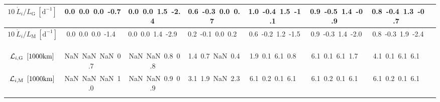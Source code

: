 \begin{table}[H]
{\begin{centering}
\begin{tabular}{|c|c|c|c|c|c|c|c|}
\hline
$10\ \dot{L}_{i}/L_{\mathrm{G}}\ \left[\mathrm{d^{-1}}\right]$ & \textcolor{C1}{0.0}\ \textcolor{C2}{0.0}\ \textcolor{C3}{0.0}\ \textcolor{C4}{-0.7}\  & \textcolor{C1}{0.0}\ \textcolor{C2}{0.0}\ \textcolor{C3}{1.5}\ \textcolor{C4}{-2.4}\  & \textcolor{C1}{0.6}\ \textcolor{C2}{-0.3}\ \textcolor{C3}{0.0}\ \textcolor{C4}{0.7}\  & \textcolor{C1}{1.0}\ \textcolor{C2}{-0.4}\ \textcolor{C3}{1.5}\ \textcolor{C4}{-1.1}\  & \textcolor{C1}{0.9}\ \textcolor{C2}{-0.5}\ \textcolor{C3}{1.4}\ \textcolor{C4}{-0.9}\  & \textcolor{C1}{0.8}\ \textcolor{C2}{-0.4}\ \textcolor{C3}{1.3}\ \textcolor{C4}{-0.7}\  \tabularnewline
\hline
$10\ \dot{L}_{i}/L_{\mathrm{M}}\ \left[\mathrm{d^{-1}}\right]$ & \textcolor{C1}{0.0}\ \textcolor{C2}{0.0}\ \textcolor{C3}{0.0}\ \textcolor{C4}{-1.4}\  & \textcolor{C1}{0.0}\ \textcolor{C2}{0.0}\ \textcolor{C3}{1.4}\ \textcolor{C4}{-2.9}\  & \textcolor{C1}{0.2}\ \textcolor{C2}{-0.1}\ \textcolor{C3}{0.0}\ \textcolor{C4}{0.2}\  & \textcolor{C1}{0.6}\ \textcolor{C2}{-0.2}\ \textcolor{C3}{1.2}\ \textcolor{C4}{-1.5}\  & \textcolor{C1}{0.9}\ \textcolor{C2}{-0.3}\ \textcolor{C3}{1.4}\ \textcolor{C4}{-2.0}\  & \textcolor{C1}{0.8}\ \textcolor{C2}{-0.3}\ \textcolor{C3}{1.9}\ \textcolor{C4}{-2.4}\  \tabularnewline
\hline
${\cal L}_{i,\mathrm{G}}\ \left[1000\mathrm{km}\right]$ & \textcolor{C1}{NaN}\ \textcolor{C2}{NaN}\ \textcolor{C3}{NaN}\ \textcolor{C4}{0.7}\  & \textcolor{C1}{NaN}\ \textcolor{C2}{NaN}\ \textcolor{C3}{0.8}\ \textcolor{C4}{0.8}\  & \textcolor{C1}{1.4}\ \textcolor{C2}{0.7}\ \textcolor{C3}{NaN}\ \textcolor{C4}{0.4}\  & \textcolor{C1}{1.9}\ \textcolor{C2}{0.1}\ \textcolor{C3}{6.1}\ \textcolor{C4}{0.8}\  & \textcolor{C1}{6.1}\ \textcolor{C2}{0.1}\ \textcolor{C3}{6.1}\ \textcolor{C4}{1.7}\  & \textcolor{C1}{4.1}\ \textcolor{C2}{0.1}\ \textcolor{C3}{6.1}\ \textcolor{C4}{6.1}\  \tabularnewline
\hline
${\cal L}_{i,\mathrm{M}}\ \left[1000\mathrm{km}\right]$ & \textcolor{C1}{NaN}\ \textcolor{C2}{NaN}\ \textcolor{C3}{NaN}\ \textcolor{C4}{1.0}\  & \textcolor{C1}{NaN}\ \textcolor{C2}{NaN}\ \textcolor{C3}{0.9}\ \textcolor{C4}{0.9}\  & \textcolor{C1}{3.1}\ \textcolor{C2}{1.9}\ \textcolor{C3}{NaN}\ \textcolor{C4}{2.3}\  & \textcolor{C1}{6.1}\ \textcolor{C2}{0.2}\ \textcolor{C3}{0.1}\ \textcolor{C4}{6.1}\  & \textcolor{C1}{6.1}\ \textcolor{C2}{0.2}\ \textcolor{C3}{0.1}\ \textcolor{C4}{6.1}\  & \textcolor{C1}{6.1}\ \textcolor{C2}{0.2}\ \textcolor{C3}{0.1}\ \textcolor{C4}{6.1}\  \tabularnewline
\hline
 &  &  &  &  &  & \tabularnewline
\hline
\end{tabular}
\par\end{centering} }
\end{table}
